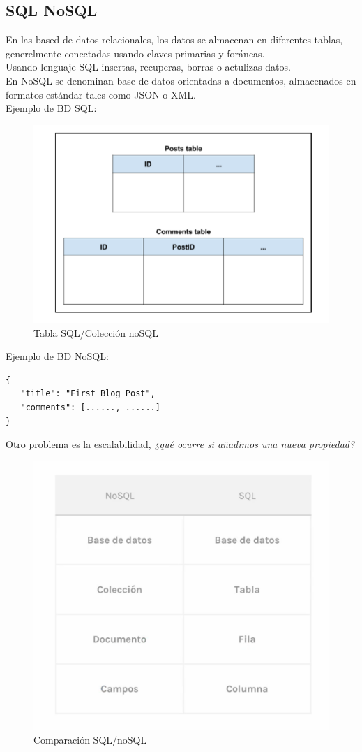 \documentclass[4paper]{article}
\begin{document}
\subsection{SQL NoSQL}
En las based de datos relacionales, los datos se almacenan en diferentes tablas, generelmente conectadas usando claves primarias y foráneas.\\
Usando lenguaje SQL insertas, recuperas, borras o actulizas datos.\\
En NoSQL se denominan base de datos orientadas a documentos, almacenados en formatos estándar tales como JSON o XML.\\
Ejemplo de BD SQL:
\begin{figure}[H]
\includegraphics[scale=0.5]{sql.png}
\caption{Tabla SQL/Colección noSQL}
\end{figure}
Ejemplo de BD NoSQL:
\begin{lstlisting}
{
   "title": "First Blog Post",
   "comments": [......, ......]
}
\end{lstlisting}
Otro problema es la escalabilidad, \emph{¿qué ocurre si añadimos una nueva propiedad?}

\begin{figure}[H]
\includegraphics[scale=0.5]{noSQL.png}
\caption{Comparación SQL/noSQL}
\end{figure}
\end{document}
